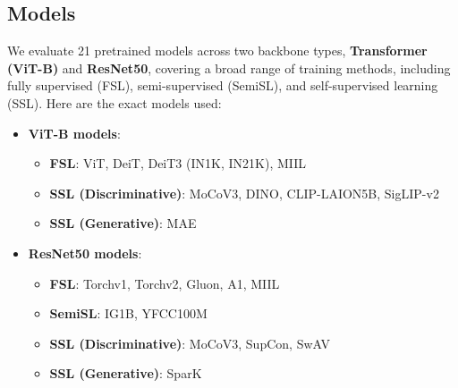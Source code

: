 \documentclass[10pt,twocolumn]{article}
\begin{document}
\subsection{Models}
We evaluate 21 pretrained models across two backbone types, \textbf{Transformer (ViT-B)} and \textbf{ResNet50}, covering a broad range of training methods, including fully supervised (FSL), semi-supervised (SemiSL), and self-supervised learning (SSL).  
Here are the exact models used:
\begin{itemize} [topsep=3pt, itemsep=2pt, parsep=1pt]
    \item \textbf{ViT-B models}:
    \begin{itemize}[topsep=3pt, itemsep=2pt, parsep=1pt]
        \item \textbf{FSL}: ViT\cite{dosovitskiy_image_2021}, DeiT\cite{touvron_training_2021}, DeiT3 (IN1K, IN21K)\cite{avidan_deit_2022}, MIIL \cite{ridnik_imagenet-21k_2021}
        \item \textbf{SSL (Discriminative)}: MoCoV3\cite{chen_empirical_2021}, DINO\cite{caron_emerging_2021}, CLIP-LAION5B\cite{cherti_reproducible_2023}, SigLIP-v2\cite{tschannen_siglip_2025}
        \item \textbf{SSL (Generative)}: MAE\cite{he_masked_2021}
    \end{itemize}
    \item \textbf{ResNet50 models}:
    \begin{itemize}[topsep=3pt, itemsep=2pt, parsep=1pt]
        \item \textbf{FSL}: Torchv1\cite{he_deep_2015}, Torchv2\cite{he_deep_2015}, Gluon\cite{he_bag_2018}, A1\cite{wightman_resnet_2021}, MIIL\cite{ridnik_imagenet-21k_2021}
        \item \textbf{SemiSL}: IG1B\cite{yalniz_billion-scale_2019}, YFCC100M\cite{yalniz_billion-scale_2019}
        \item \textbf{SSL (Discriminative)}: MoCoV3\cite{chen_empirical_2021}, SupCon\cite{khosla_supervised_2021}, SwAV\cite{caron_unsupervised_2021}
        \item \textbf{SSL (Generative)}: SparK\cite{tian_designing_2023}
    \end{itemize}
\end{itemize}

\end{document}
